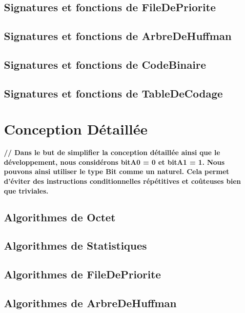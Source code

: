 \documentclass[10pt]{report}
\begin{document}
            \subsection{Signatures et fonctions de FileDePriorite}
                
            \subsection{Signatures et fonctions de ArbreDeHuffman}
                
            \subsection{Signatures et fonctions de CodeBinaire}
                
            \subsection{Signatures et fonctions de TableDeCodage}
                

        \newpage
        \section{Conception Détaillée}
            \textbf{// Dans le but de simplifier la conception détaillée ainsi que le développement, nous considérons bitA0 = 0 et bitA1 = 1. Nous pouvons ainsi utiliser le type Bit comme un naturel. Cela permet d'éviter des instructions conditionnelles répétitives et coûteuses bien que triviales.}
            \subsection{Algorithmes de Octet}
                
            \subsection{Algorithmes de Statistiques}
                
            \subsection{Algorithmes de FileDePriorite}
                
            \subsection{Algorithmes de ArbreDeHuffman}
                
\end{document}
